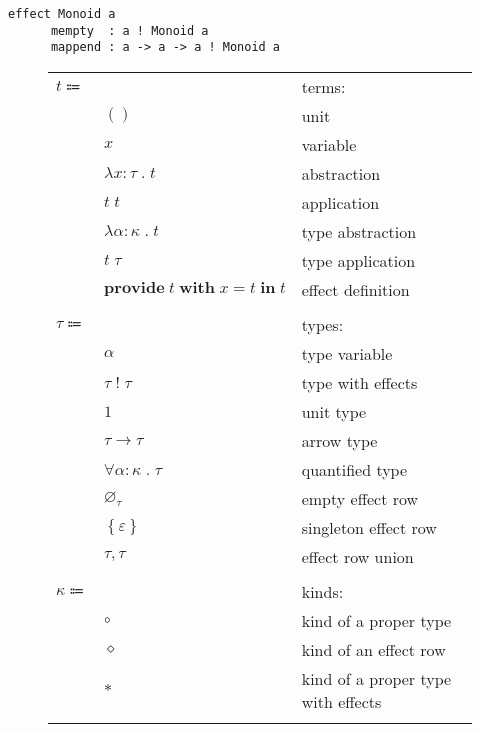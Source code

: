 \documentclass[12pt]{article}
\newcommand\anno[2]{#1 : #2}
\newcommand\term{t}
\newcommand\eunit{()}
\newcommand\evar{x}
\newcommand\eabs[2]{\lambda #1 \; . \; #2}
\newcommand\eapp[2]{#1 \; #2}
\newcommand\etabs[2]{\lambda #1 \; . \; #2}
\newcommand\etapp[2]{#1 \; #2}
\newcommand\eprovide[4]{\textbf{provide} \; #1 \; \textbf{with} \; #2 = #3 \; \textbf{in} \; #4}
\newcommand\type{\tau}
\newcommand\tvar{\alpha}
\newcommand\twitht[2]{#1 \; ! \; #2}
\newcommand\tunit{1}
\newcommand\tarrow[2]{#1 \rightarrow #2}
\newcommand\tforall[2]{\forall #1 \; . \; #2}
\newcommand\rempty{\varnothing_{\type}}
\newcommand\rsingleton[1]{\left\{ #1 \right\}}
\newcommand\runion[2]{#1, #2}
\newcommand\kind{\kappa}
\newcommand\kpt{\circ}
\newcommand\krow{\diamond}
\newcommand\ktwitht{\ast}
\newcommand\effect{\varepsilon}
\begin{document}
  \begin{lstlisting}[gobble=4]
    effect Monoid a
      mempty  : a ! Monoid a
      mappend : a -> a -> a ! Monoid a
  \end{lstlisting}

  \begin{figure}
    \begin{mdframed}[backgroundcolor=none]
      \begin{center}
        \begin{tabular}{l l l}
          $\term \Coloneqq $ & & terms: \\
          & $\eunit$ & unit \\
          & $\evar$ & variable \\
          & $\eabs{\anno{\evar}{\type}}{\term}$ & abstraction \\
          & $\eapp{\term}{\term}$ & application \\
          & $\etabs{\anno{\tvar}{\kind}}{\term}$ & type abstraction \\
          & $\etapp{\term}{\type}$ & type application \\
          & $\eprovide{\term}{\evar}{\term}{\term}$ & effect definition \\
          \\
          $\type \Coloneqq$ & & types: \\
          & $\tvar$ & type variable \\
          & $\twitht{\type}{\type}$ & type with effects \\
          & $\tunit$ & unit type \\
          & $\tarrow{\type}{\type}$ & arrow type \\
          & $\tforall{\anno{\tvar}{\kind}}{\type}$ & quantified type \\
          & $\rempty$ & empty effect row \\
          & $\rsingleton{\effect}$ & singleton effect row \\
          & $\runion{\type}{\type}$ & effect row union \\
          \\
          $\kind \Coloneqq$ & & kinds: \\
          & $\kpt$ & kind of a proper type \\
          & $\krow$ & kind of an effect row \\
          & $\ktwitht$ & kind of a proper type with effects \\
          \\

\end{tabular}
\end{center}
\end{mdframed}
\end{figure}
\end{document}
